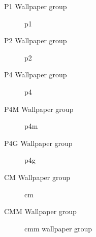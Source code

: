 \begin{frame}{P1 Wallpaper group}
    \begin{figure}
        \centering
        
        \caption{p1}
        \label{fig:p1}
    \end{figure}
\end{frame}

\begin{frame}{P2 Wallpaper group}
    \begin{figure}
        \centering
        
        \caption{p2}
        \label{fig:p2}
    \end{figure}
\end{frame}

\begin{frame}{P4 Wallpaper group}
    \begin{figure}
        \centering
        
        \caption{p4}
        \label{fig:p4}
    \end{figure}
\end{frame}

\begin{frame}{P4M Wallpaper group}
    \begin{figure}
        \centering
        
        \caption{p4m}
        \label{fig:p4m}
    \end{figure}
\end{frame}

\begin{frame}{P4G Wallpaper group}
    \begin{figure}
        \centering
        
        \caption{p4g}
        \label{fig:p4g}
    \end{figure}
\end{frame}

\begin{frame}{CM Wallpaper group}
    \begin{figure}
        \centering
        
        \caption{cm}
        \label{fig:cm}
    \end{figure}
\end{frame}

\begin{frame}{CMM Wallpaper group}
    \begin{figure}
        \centering
        
        \caption{cmm wallpaper group}
        \label{fig:cmm}
    \end{figure}
\end{frame}

